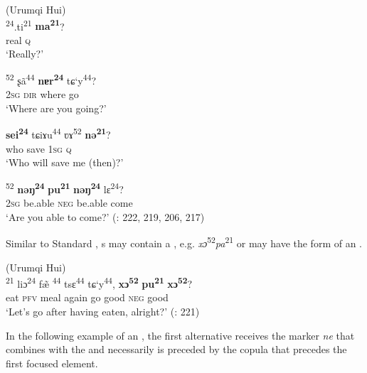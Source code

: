 \ea%
    \label{ex:trans:15}
     (Urumqi Hui)\\
    \ea
    \textsuperscript{24}{.ti}\textsuperscript{21}  \textbf{{ma}}\textbf{\textsuperscript{21}}?\\
    real    \textsc{q}\\
    \glt ‘Really?’
    
    \ex
    \textsuperscript{52}  {ʂã}\textsuperscript{44}  \textbf{{nɐr}}\textbf{\textsuperscript{24}}  {tɕ‘y}\textsuperscript{44}?\\
    2\textsc{sg}  \textsc{dir}  where  go\\
    \glt ‘Where are you going?’
    
    \ex
    \gll \textbf{{sei}}\textbf{\textsuperscript{24}}  {tɕiɤu}\textsuperscript{44}    {ʋɤ}\textsuperscript{52}  \textbf{{nə}}\textbf{\textsuperscript{21}}?\\
    who  save    1\textsc{sg}  \textsc{q}\\
    \glt ‘Who will save me (then)?’
    
    \ex
    \textsuperscript{52}  \textbf{{nəŋ}}\textbf{\textsuperscript{24}} \textbf{{pu}}\textbf{\textsuperscript{21}} \textbf{{nəŋ}}\textbf{\textsuperscript{24}}    {lɛ}\textsuperscript{24}?\\
    2\textsc{sg}  be.able    \textsc{neg}  be.able    come\\
    \glt ‘Are you able to come?’ (\citealt{LiuLiji1989}: 222, 219, 206, 217)\z\z

Similar to Standard , s may contain a , e.g. \textit{xɔ}\textsuperscript{52}\textit{pa}\textsuperscript{21}  or may have the form of an .

\ea%
    \label{ex:trans:16}
     (Urumqi Hui)\\
    \textsuperscript{21}  {liɔ}\textsuperscript{24}  {f\~{æ}}\textsuperscript{ 44}  {tsɛ}\textsuperscript{44}  {tɕ‘y}\textsuperscript{44},  \textbf{{xɔ}}\textbf{\textsuperscript{52} }\textbf{{pu}}\textbf{\textsuperscript{21}} \textbf{{xɔ}}\textbf{\textsuperscript{52}}?\\
    eat  \textsc{pfv}  meal  again  go  good  \textsc{neg}  good\\
    \glt ‘Let’s go after having eaten, alright?’ (\citealt{LiuLiji1989}: 221)
    \z

In the following example of an  , the first alternative receives the marker \textit{ne}  that combines with the  and necessarily is preceded by the copula that precedes the first focused element.


